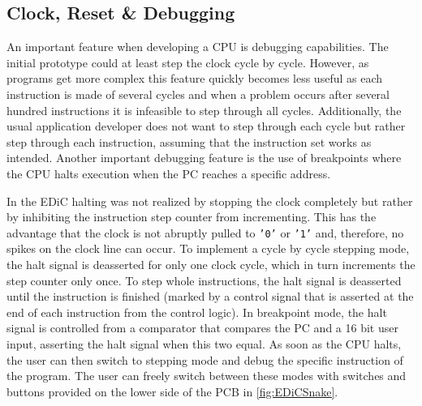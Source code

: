 \subsection{Clock, Reset \& Debugging}\label{sec:clock}
An important feature when developing a \gls{CPU} is debugging capabilities.
The initial prototype could at least step the clock cycle by cycle.
However, as programs get more complex this feature quickly becomes less useful as each instruction is made of several cycles and when a problem occurs after several hundred instructions it is infeasible to step through all cycles.
Additionally, the usual application developer does not want to step through each cycle but rather step through each instruction, assuming that the instruction set works as intended.
Another important debugging feature is the use of breakpoints where the \gls{CPU} halts execution when the \gls{PC} reaches a specific address.

In the \gls{EDiC} halting was not realized by stopping the clock completely but rather by inhibiting the instruction step counter from incrementing.
This has the advantage that the clock is not abruptly pulled to \texttt{'0'} or \texttt{'1'} and, therefore, no spikes on the clock line can occur.
To implement a cycle by cycle stepping mode, the halt signal is deasserted for only one clock cycle, which in turn increments the step counter only once.
To step whole instructions, the halt signal is deasserted until the instruction is finished (marked by a control signal that is asserted at the end of each instruction from the control logic).
In breakpoint mode, the halt signal is controlled from a comparator that compares the \gls{PC} and a 16 bit user input, asserting the halt signal when this two equal.
As soon as the \gls{CPU} halts, the user can then switch to stepping mode and debug the specific instruction of the program.
The user can freely switch between these modes with switches and buttons provided on the lower side of the \gls{PCB} in \cref{fig:EDiCSnake}.

